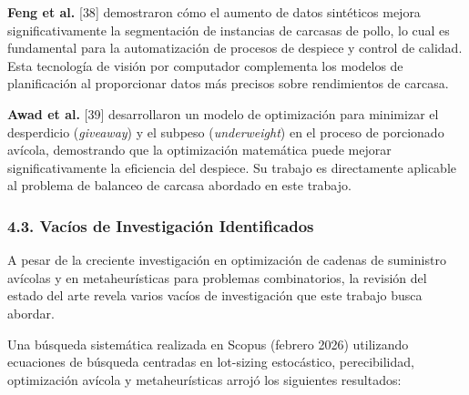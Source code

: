 \documentclass[
  spanish,
  12pt,
]{article}
\begin{document}
\textbf{Feng et al.} {[}38{]} demostraron cómo el aumento de datos
sintéticos mejora significativamente la segmentación de instancias de
carcasas de pollo, lo cual es fundamental para la automatización de
procesos de despiece y control de calidad. Esta tecnología de visión por
computador complementa los modelos de planificación al proporcionar
datos más precisos sobre rendimientos de carcasa.

\textbf{Awad et al.} {[}39{]} desarrollaron un modelo de optimización
para minimizar el desperdicio (\emph{giveaway}) y el subpeso
(\emph{underweight}) en el proceso de porcionado avícola, demostrando
que la optimización matemática puede mejorar significativamente la
eficiencia del despiece. Su trabajo es directamente aplicable al
problema de balanceo de carcasa abordado en este trabajo.

\subsubsection{4.3. Vacíos de Investigación
Identificados}\label{vacuxedos-de-investigaciuxf3n-identificados}

A pesar de la creciente investigación en optimización de cadenas de
suministro avícolas y en metaheurísticas para problemas combinatorios,
la revisión del estado del arte revela varios vacíos de investigación
que este trabajo busca abordar.

Una búsqueda sistemática realizada en Scopus (febrero 2026) utilizando
ecuaciones de búsqueda centradas en lot-sizing estocástico,
perecibilidad, optimización avícola y metaheurísticas arrojó los
siguientes resultados:
\end{document}
